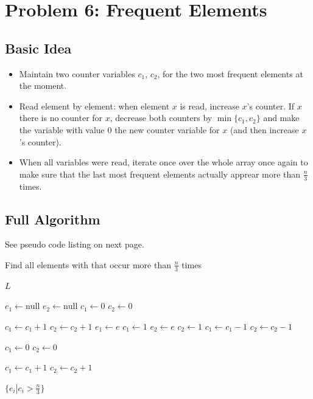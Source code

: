 \documentclass[12pt]{article}
\begin{document}
\newpage
\section*{Problem 6: Frequent Elements}
\subsection*{Basic Idea}
\begin{itemize}
	\item Maintain two counter variables $c_1$, $c_2$, for the two most frequent elements at the moment.
	\item Read element by element: when element $x$ is read, increase $x$'s counter. If $x$ there is no counter for $x$, decrease both counters by $\min \{c_1, c_2\}$ and make the variable with value 0 the new counter variable for $x$ (and then increase $x$'s counter).
	\item When all variables were read, iterate once over the whole array once again to make sure that the last most frequent elements actually apprear more than $\frac{n}{3}$ times.
\end{itemize}

\subsection*{Full Algorithm}
See pseudo code listing on next page.

\begin{algorithm}
  \caption{Find all elements with that occur more than $\frac{n}{3}$ times}
  \begin{algorithmic}[1]

			\State \Return $L$
		\EndIf

		\State $e_1 \gets \mbox{null}$
		\State $e_2 \gets \mbox{null}$
		\State $c_1 \gets 0$
		\State $c_2 \gets 0$
		
				\State $c_1 \gets c_1 + 1$
				\State $c_2 \gets c_2 + 1$
				\State $e_1 \gets e$
				\State $c_1 \gets 1$
				\State $e_2 \gets e$
				\State $c_2 \gets 1$
			\Else
				\State $c_1 \gets c_1 - 1$
				\State $c_2 \gets c_2 - 1$
			\EndIf
		\EndFor
		
		\State $c_1 \gets 0$
		\State $c_2 \gets 0$
		
				\State $c_1 \gets c_1 + 1$
				\State $c_2 \gets c_2 + 1$
			\EndIf
		\EndFor
		
		\State \Return $\{e_i \left.\right| c_i > \frac{n}{3}\}$ 
    \EndFunction
  \end{algorithmic}
\end{algorithm}
\end{document}
